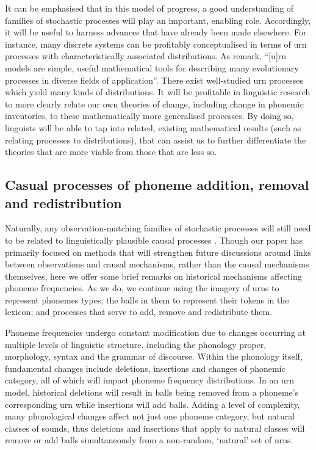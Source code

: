It can be emphasised that in this model of progress, a good understanding of families of stochastic processes will play an important, enabling role. Accordingly, it will be useful to harness advances that have already been made elsewhere. For instance, many discrete systems can be profitably conceptualised in terms of urn processes with characteristically associated distributions. As \textcite[p.~87]{kuba2012limiting} remark, ``{[}u{]}rn models are simple, useful mathematical tools for describing many evolutionary processes in diverse fields of application''. There exist well-studied urn processes which yield many kinds of distributions. It will be profitable in linguistic research to more clearly relate our own theories of change, including change in phonemic inventories, to these mathematically more generalised processes. By doing so, linguists will be able to tap into related, existing mathematical results (such as relating processes to distributions), that can assist us to further differentiate the theories that are more viable from those that are less so.

\hypertarget{casual-processes-of-phoneme-addition-removal-and-redistribution}{%
\subsection{Casual processes of phoneme addition, removal and redistribution}\label{casual-processes-of-phoneme-addition-removal-and-redistribution}}

Naturally, any observation-matching families of stochastic processes will still need to be related to linguistically plausible causal processes \autocite{cysouw_probability_2009}. Though our paper has primarily focused on methods that will strengthen future discussions around links between observations and causal mechanisms, rather than the causal mechanisms themselves, here we offer some brief remarks on historical mechanisms affecting phoneme frequencies. As we do, we continue using the imagery of urns to represent phonemes types; the balls in them to represent their tokens in the lexicon; and processes that serve to add, remove and redistribute them. \autocite[For a like-minded review of potential mechanisms behind Zipf's law in the frequencies of \emph{words}, see][]{piantadosi2014zipf}

Phoneme frequencies undergo constant modification due to changes occurring at multiple levels of linguistic structure, including the phonology proper, morphology, syntax and the grammar of discourse. Within the phonology itself, fundamental changes include deletions, insertions and changes of phonemic category, all of which will impact phoneme frequency distributions. In an urn model, historical deletions will result in balls being removed from a phoneme's corresponding urn while insertions will add balls. Adding a level of complexity, many phonological changes affect not just one phoneme category, but natural classes of sounds, thus deletions and insertions that apply to natural classes will remove or add balls simultaneously from a non-random, `natural' set of urns.

